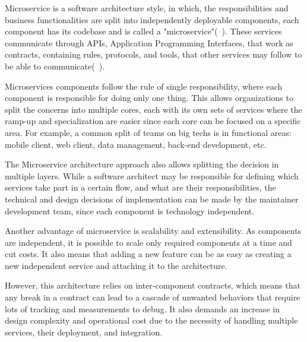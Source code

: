 Microservice is a software architecture style, in which, the responsibilities and business functionalities are split into independently deployable components, each component has its codebase and is called a "microservice"(~\cite{Micro}). These services communicate through APIs, Application Programming Interfaces, that work as contracts, containing rules, protocols, and tools, that other services may follow to be able to communicate(~\cite{Microservices}).

Microservices components follow the rule of single responsibility, where each component is responsible for doing only one thing. This allows organizations to split the concerns into multiple cores, each with its own sets of services where the ramp-up and specialization are easier since each core can be focused on a specific area. For example, a common split of teams on big techs is in functional areas: mobile client, web client, data management, back-end development, etc.

The Microservice architecture approach also allows splitting the decision in multiple layers. While a software architect may be responsible for defining which services take part in a certain flow, and what are their responsibilities, the technical and design decisions of implementation can be made by the maintainer development team, since each component is technology independent.

Another advantage of microservice is scalability and extensibility. As components are independent, it is possible to scale only required components at a time and cut costs. It also means that adding a new feature can be as easy as creating a new independent service and attaching it to the architecture.

However, this architecture relies on inter-component contracts, which means that any break in a contract can lead to a cascade of unwanted behaviors that require lots of tracking and measurements to debug. It also demands an increase in design complexity and operational cost due to the necessity of handling multiple services, their deployment, and integration.
